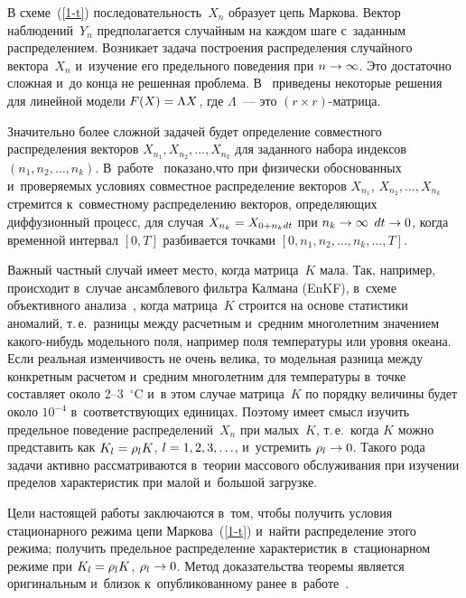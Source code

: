 \begin{multicols}{2}
В схеме~(\ref{1-t}) последовательность~$X_n$ образует цепь Маркова.
Вектор наблюдений~$Y_n$ предполагается случайным на каждом шаге с~заданным
распределением. Возникает задача построения распределения случайного
вектора~$X_n$ и~изучение его предельного поведения при $n \hm\rightarrow \infty$.
Это достаточно сложная и~до конца не решенная проблема. В~\cite{Belyaev1} приведены некоторые решения для линейной модели $F(X)\hm=\Lambda X$, где $\Lambda$~--- это $(r \times r)$-мат\-рица.

Значительно более сложной задачей будет определение совместного распределения
векторов $X_{n_1}, X_{n_2}, \ldots, X_{n_k}$ для заданного набора индексов
$(n_1, n_2, \ldots , n_k)$. В~работе~\cite{Tanajura} показано,\linebreak что
при физически обоснованных и~про\-ве\-ря\-емых условиях совместное распределение
векторов $X_{n_1}$, $X_{n_2}, \ldots, X_{n_k}$ стремится к~совместному распределению
векторов, определяющих диффузионный процесс, для случая
$X_{n_k}\hm=X_{0+n_k dt}$ при $n_k \hm\rightarrow \infty $ $dt \hm\rightarrow 0$,
когда временной интервал $[0,T]$ разбивается точками
$[0, n_1, n_2, \ldots, n_k, \ldots, T]$.

Важный частный случай имеет место, когда мат\-ри\-ца~$K$ мала. Так, например,
происходит в~случае  ансамблевого фильтра Калмана (EnKF), в~схеме объективного
анализа~\cite{Jazwinski, Evensen2}, когда матрица~$K$ строится на основе
статистики аномалий, т.\,е.\ разницы между расчетным и~средним
многолетним значением ка\-ко\-го-ни\-будь модельного поля, например
поля температуры или уровня океана. Если реальная изменчивость не очень велика,
то модельная разница между конкретным расчетом и~средним многолетним для
температуры в~точке составляет около 2--3~$^\circ$C и~в этом случае матрица~$K$
по порядку величины будет около $10^{-4}$ в~соответствующих единицах.
Поэтому имеет смысл изучить предельное поведение распределений~$X_n$
при малых~$K$, т.\,е.\ когда $K$ можно представить как $K_l\hm=\rho_l K$,
$l\hm=1, 2, 3, \ldots$, и~устремить $\rho_l\hm\rightarrow 0$. Такого рода
задачи активно рассматриваются в~теории массового обслуживания при изучении
пределов характеристик при малой и~большой загрузке.

Цели настоящей работы заключаются в~том, чтобы  получить условия
стационарного режима цепи Маркова~(\ref{1-t}) и~найти распределение этого
режима; получить предельное распределение характеристик в~стационарном режиме
при $K_l\hm=\rho_l K$, $\rho_l\hm\rightarrow 0$. Метод доказательства  теоремы
является оригинальным и~близок к~опубликованному ранее в~работе~\cite{Belyaev2}.



\end{multicols}
